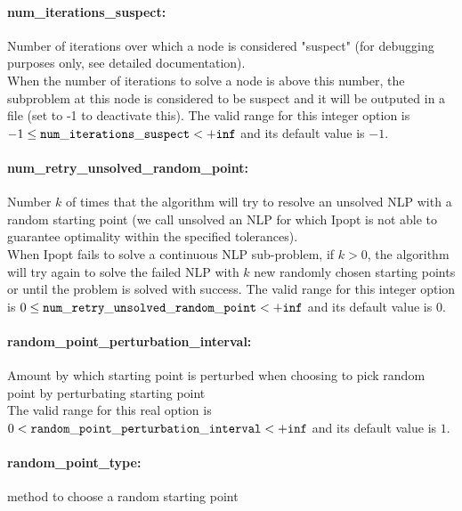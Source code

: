 \paragraph{num\_iterations\_suspect:}\label{sec:num_iterations_suspect} Number of iterations over which a node is considered "suspect" (for debugging purposes only, see detailed documentation). $\;$ \\
 When the number of iterations to solve a node is
above this number, the subproblem at this node is
considered to be suspect and it will be outputed
in a file (set to -1 to deactivate this). The valid range for this integer option is
$-1 \le {\tt num\_iterations\_suspect } <  {\tt +inf}$
and its default value is $-1$.


\paragraph{num\_retry\_unsolved\_random\_point:}\label{sec:num_retry_unsolved_random_point} Number $k$ of times that the algorithm will try to resolve an unsolved NLP with a random starting point (we call unsolved an NLP for which Ipopt is not able to guarantee optimality within the specified tolerances). $\;$ \\
 When Ipopt fails to solve a continuous NLP
sub-problem, if $k > 0$, the algorithm will try
again to solve the failed NLP with $k$ new
randomly chosen starting points  or until the
problem is solved with success. The valid range for this integer option is
$0 \le {\tt num\_retry\_unsolved\_random\_point } <  {\tt +inf}$
and its default value is $0$.


\paragraph{random\_point\_perturbation\_interval:}\label{sec:random_point_perturbation_interval} Amount by which starting point is perturbed when choosing to pick random point by perturbating starting point $\;$ \\
 The valid range for this real option is 
$0 <  {\tt random\_point\_perturbation\_interval } <  {\tt +inf}$
and its default value is $1$.


\paragraph{random\_point\_type:}\label{sec:random_point_type} method to choose a random starting point $\;$ \\

